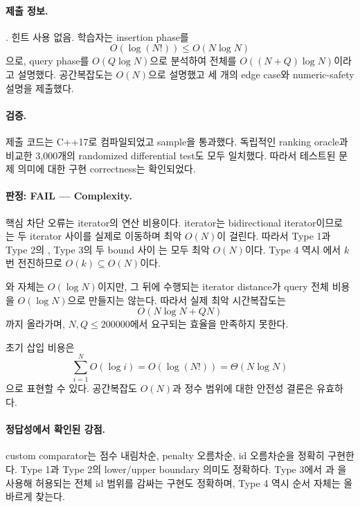 \paragraph{제출 정보.}
. 힌트 사용 없음. 학습자는 insertion phase를
\[
O(\log(N!)) \le O(N\log N)
\]
으로, query phase를 $O(Q\log N)$으로 분석하여 전체를 $O((N+Q)\log N)$이라고 설명했다. 공간복잡도는 $O(N)$으로 설명했고 세 개의 edge case와 numeric-safety 설명을 제출했다.

\paragraph{검증.}
제출 코드는 C++17로 컴파일되었고 sample을 통과했다. 독립적인 ranking oracle과 비교한 3,000개의 randomized differential test도 모두 일치했다. 따라서 테스트된 문제 의미에 대한 구현 correctness는 확인되었다.

\paragraph{판정: FAIL --- Complexity.}
핵심 차단 오류는  iterator의 연산 비용이다.  iterator는 bidirectional iterator이므로 는 두 iterator 사이를 실제로 이동하며 최악 $O(N)$이 걸린다. 따라서 Type 1과 Type 2의 , Type 3의 두 bound 사이 는 모두 최악 $O(N)$이다. Type 4 역시 에서 $k$번 전진하므로 $O(k)\subseteq O(N)$이다.

와  자체는 $O(\log N)$이지만, 그 뒤에 수행되는 iterator distance가 query 전체 비용을 $O(\log N)$으로 만들지는 않는다. 따라서 실제 최악 시간복잡도는
\[
O(N\log N + QN)
\]
까지 올라가며, $N,Q\le 200000$에서 요구되는 효율을 만족하지 못한다.

초기 삽입 비용은
\[
\sum_{i=1}^{N} O(\log i)
=O(\log(N!))
=\Theta(N\log N)
\]
으로 표현할 수 있다. 공간복잡도 $O(N)$과 정수 범위에 대한  안전성 결론은 유효하다.

\paragraph{정답성에서 확인된 강점.}
custom comparator는 점수 내림차순, penalty 오름차순, id 오름차순을 정확히 구현한다. Type 1과 Type 2의 lower/upper boundary 의미도 정확하다. Type 3에서 과 을 사용해 허용되는 전체 id 범위를 감싸는 구현도 정확하며, Type 4 역시 순서 자체는 올바르게 찾는다.

